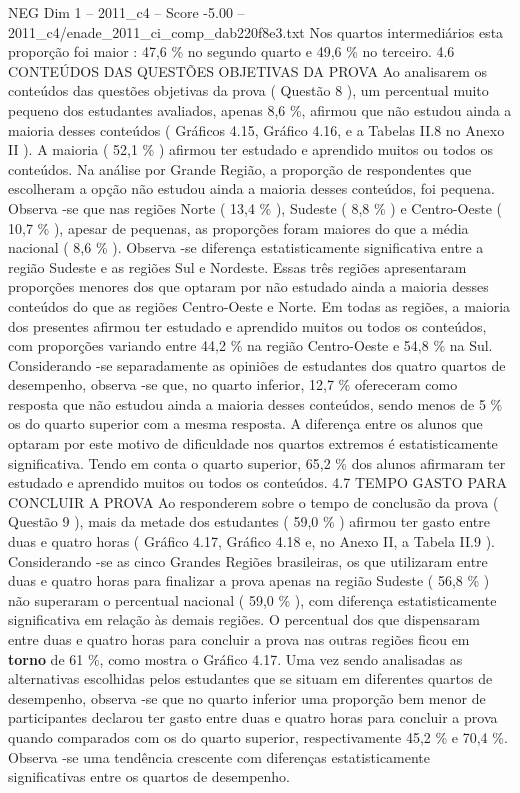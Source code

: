 \begin{textsample}{NEG Dim 1 – 2011\_c4 – Score -5.00 – 2011\_c4/enade\_2011\_ci\_comp\_dab220f8e3.txt}
Nos quartos intermediários esta proporção foi maior : 47,6 \% no segundo quarto e 49,6 \% no terceiro. 4.6 CONTEÚDOS DAS QUESTÕES OBJETIVAS DA PROVA Ao analisarem os conteúdos das questões objetivas da prova ( Questão 8 ), um percentual muito pequeno dos estudantes avaliados, apenas 8,6 \%, afirmou que não estudou ainda a maioria desses conteúdos ( Gráficos 4.15, Gráfico 4.16, e a Tabelas II.8 no Anexo II ).
A maioria ( 52,1 \% ) afirmou ter estudado e aprendido muitos ou todos os conteúdos.
Na análise por Grande Região, a proporção de respondentes que escolheram a opção não estudou ainda a maioria desses conteúdos, foi pequena.
Observa -se que nas regiões Norte ( 13,4 \% ), Sudeste ( 8,8 \% ) e Centro-Oeste ( 10,7 \% ), apesar de pequenas, as proporções foram maiores do que a média nacional ( 8,6 \% ).
Observa -se diferença estatisticamente significativa entre a região Sudeste e as regiões Sul e Nordeste.
Essas três regiões apresentaram proporções menores dos que optaram por não estudado ainda a maioria desses conteúdos do que as regiões Centro-Oeste e Norte.
Em todas as regiões, a maioria dos presentes afirmou ter estudado e aprendido muitos ou todos os conteúdos, com proporções variando entre 44,2 \% na região Centro-Oeste e 54,8 \% na Sul.
Considerando -se separadamente as opiniões de estudantes dos quatro quartos de desempenho, observa -se que, no quarto inferior, 12,7 \% ofereceram como resposta que não estudou ainda a maioria desses conteúdos, sendo menos de 5 \% os do quarto superior com a mesma resposta.
A diferença entre os alunos que optaram por este motivo de dificuldade nos quartos extremos é estatisticamente significativa.
Tendo em conta o quarto superior, 65,2 \% dos alunos afirmaram ter estudado e aprendido muitos ou todos os conteúdos. 4.7 TEMPO GASTO PARA CONCLUIR A PROVA Ao responderem sobre o tempo de conclusão da prova ( Questão 9 ), mais da metade dos estudantes ( 59,0 \% ) afirmou ter gasto entre duas e quatro horas ( Gráfico 4.17, Gráfico 4.18 e, no Anexo II, a Tabela II.9 ).
Considerando -se as cinco Grandes Regiões brasileiras, os que utilizaram entre duas e quatro horas para finalizar a prova apenas na região Sudeste ( 56,8 \% ) não superaram o percentual nacional ( 59,0 \% ), com diferença estatisticamente significativa em relação às demais regiões.
O percentual dos que dispensaram entre duas e quatro horas para concluir a prova nas outras regiões ficou em \textbf{torno} de 61 \%, como mostra o Gráfico 4.17.
Uma vez sendo analisadas as alternativas escolhidas pelos estudantes que se situam em diferentes quartos de desempenho, observa -se que no quarto inferior uma proporção bem menor de participantes declarou ter gasto entre duas e quatro horas para concluir a prova quando comparados com os do quarto superior, respectivamente 45,2 \% e 70,4 \%.
Observa -se uma tendência crescente com diferenças estatisticamente significativas entre os quartos de desempenho.

\end{textsample}
